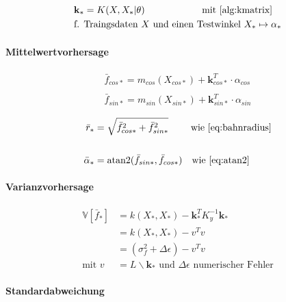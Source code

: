 \begin{align}\label{eq:kvektor}
	& \mathbf{k}_* =  K(X, X_* | \theta) \qquad\qquad\qquad \text{mit } \text{\autoref{alg:kmatrix}} \\
	& \text{f. Traingsdaten } X \text{ und } \text{einen Testwinkel } X_* \mapsto \alpha_* \nonumber
\end{align}


\paragraph*{Mittelwertvorhersage}


\begin{align}\label{eq:predmean}
	\bar{f}_{cos*} = m_{cos}(X_{cos*}) + \mathbf{k}_{cos*}^T \cdot \alpha_{cos} \nonumber \\
	\\
	\bar{f}_{sin*} = m_{sin}(X_{sin*}) + \mathbf{k}_{sin*}^T \cdot \alpha_{sin} \nonumber
\end{align}


\begin{align}\label{eq:predangrad}
	\bar{r}_* &= \sqrt{\bar{f}_{cos*}^2 + \bar{f}_{sin*}^2} \quad\quad\ \text{wie \autoref{eq:bahnradius}} \nonumber \\
	\\
	\bar{\alpha}_* &= \text{atan2}(\bar{f}_{sin*}, \bar{f}_{cos*}) \quad \text{wie \autoref{eq:atan2}} \nonumber
\end{align}



\paragraph*{Varianzvorhersage}


\begin{align}\label{eq:predvar}
	\mathbb{V}\left[ \bar{f}_* \right] &= k(X_*, X_*) - \mathbf{k}_*^T K_y^{-1} \mathbf{k}_* \nonumber \\
									   &= k(X_*, X_*) - v^T v \\
									   &= (\sigma_f^2 + \Delta\epsilon) - v^T v \nonumber \\
						 \text{mit } v &= L \backslash \mathbf{k}_* \text{ und } \Delta\epsilon \text{ numerischer Fehler} \nonumber
\end{align}


\paragraph*{Standardabweichung}


